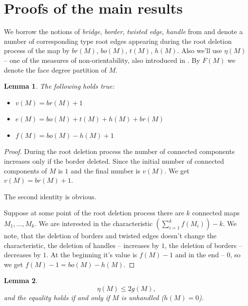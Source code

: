 \documentclass{article}
\newtheorem{lemma}{Lemma}
\begin{document}
\section{Proofs of the main results}

We borrow the notions of \emph{bridge}, \emph{border}, \emph{twisted
  edge}, \emph{handle} from \cite{dolega} and denote a number of
corresponding type root edges appearing during the root deletion
process of the map by $br(M)$, $bo(M)$, $t(M)$, $h(M)$. Also we'll
 use $\eta(M)$ -- one of the measures of non-orientability, also introduced in \cite{dolega}. By $F(M)$ we denote the face degree partition of $M$.

\begin{lemma}\label{lemma:map_char_identitites} The following holds true:
    \begin{itemize}
        \item $v(M) = br(M) + 1$
        \item $e(M) = bo(M) + t(M) + h(M) + br(M)$
        \item $f(M) = bo(M) - h(M) + 1$
    \end{itemize}
\end{lemma}
\begin{proof}
    During the root deletion process the number of connected components increases only if the border deleted. Since the initial number of connected components of $M$ is $1$ and the final number is $v(M)$. We get $v(M) = br(M) + 1$.

    The second identity is obvious.

    Suppose at some point of the root deletion process there are $k$
    connected maps $M_1, \ldots, M_k$. We are interested in the
    characteristic $\left(\sum\limits_{i = 1}^{k}f(M_i)\right) -
    k$. We note, that the deletion of borders and twisted edges
    doesn't change the characteristic, the deletion of handles --
    increases  by $1$, the deletion of borders -- decreases  by $1$. At the beginning it's value is $f(M) - 1$ and in the end -- $0$, so we get $f(M) - 1 = bo(M) - h(M)$.
\end{proof}

\begin{lemma}\label{lemma:eta_bound}
    $$
        \eta(M) \leq 2g(M),
    $$
    and the equality holds if and only if $M$ is unhandled ($h(M) = 0$).
\end{lemma}
\end{document}
